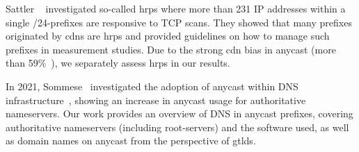 Sattler \etal~\cite{SattlerEtAl_PackedBrimInvestigating_2023} investigated so-called \glspl{hrp}
where more than \num{231} IP addresses within a single /24-prefixes are responsive to TCP scans.
%
They showed that many prefixes originated by \glspl{cdn} are \glspl{hrp} and provided guidelines on how to manage such prefixes in measurement studies.
%
Due to the strong \gls{cdn} bias in anycast (more than 59\%~\cite{Hendriks_LACeS_An_Open_2025}),
we separately assess \glspl{hrp} in our results.

In 2021, Sommese \etal~investigated the adoption of anycast within DNS infrastructure~\cite{dns-anycast},
showing an increase in anycast usage for authoritative nameservers.
%
Our work provides an overview of DNS in anycast prefixes,
covering authoritative nameservers (including root-servers) and the software used, as well as domain names on anycast from the perspective of \glspl{gtld}.
